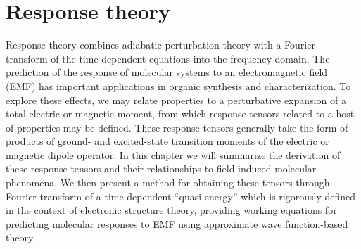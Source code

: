 \section{Response theory} \label{se:res}
Response theory combines adiabatic perturbation theory with a Fourier transform of the 
time-dependent equations into the frequency domain\cite{Barron2004,Pedersen2021}. 
The prediction of the response of molecular systems to an electromagnetic field (EMF) has 
important applications in organic synthesis and characterization. To explore these 
effects, we may relate properties to a perturbative expansion of a total electric or 
magnetic moment, from which response tensors related to a host of properties may be defined. 
These response tensors generally take the form of products of ground- and excited-state 
transition moments of the electric or magnetic dipole operator. In this chapter we will 
summarize the derivation of these response tensors and their relationships to field-induced 
molecular phenomena. We then present a method for obtaining these tensors through Fourier 
transform of a time-dependent ``quasi-energy''
\cite{Christiansen1998,Norman2011,Helgaker2012}
which is rigorously defined in the context of 
electronic structure theory, providing working equations for predicting molecular responses 
to EMF using approximate wave function-based theory.

